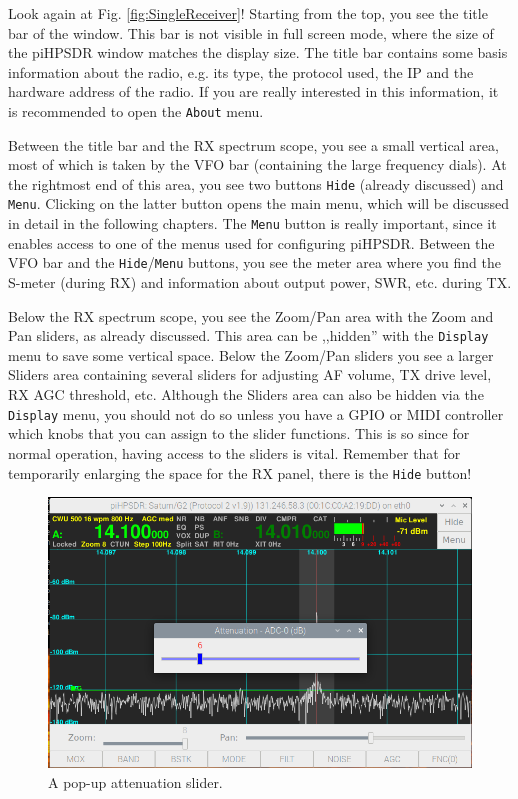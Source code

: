 \documentclass[12pt]{book}
\def\rett#1{\texttt{\color{red}#1}}
\def\bltt#1{\texttt{\color{blue}#1}}
\def\pH{pi\-HPSDR\xspace}
\begin{document}
Look again at Fig. \ref{fig:SingleReceiver}! Starting from the
top, you see the title bar of the window. This bar is not visible
in full screen mode, where the size of the \pH window matches
the display size. The title bar contains some basis information
about the radio, e.g.  its type, the protocol used, the  IP
and the hardware address of the radio. If you are really interested
in this information, it is recommended to open the
\bltt{About} menu.

Between the title bar and the RX spectrum scope, you see
a small vertical area, most of  which is taken by the VFO bar
(containing the large frequency dials). At the rightmost
end of this area, you see two buttons \rett{Hide} (already
discussed) and \rett{Menu}. Clicking on the latter button opens
the main menu, which will be discussed in detail in the following
chapters. The \rett{Menu} button is really important, since it
enables access to one of the menus used for configuring \pH.
Between the VFO bar and the \rett{Hide}/\rett{Menu} buttons,
you see the meter area where you find the S-meter (during RX)
and information about output power, SWR, etc. during TX.

Below the RX  spectrum scope, you see the Zoom/Pan area with
the  Zoom and Pan sliders, as already discussed. This area
can be ,,hidden'' with the \bltt{Display} menu to save some
vertical space. Below the
Zoom/Pan sliders you see a larger  Sliders area containing
several sliders for adjusting AF volume, TX  drive level,
RX  AGC threshold, etc. Although the Sliders area can also
be hidden via the \bltt{Display} menu, you should not do so
unless you have a GPIO or MIDI controller which knobs that
you can assign to the slider functions. This is so since
for  normal operation, having access to the sliders is vital.
Remember that for temporarily enlarging the space for
the RX  panel, there is the \rett{Hide} button!

\begin{figure}
\center
\includegraphics[width=12cm]{SliderOnScreen.png}
\caption{A pop-up attenuation slider.}
\label{fig:SliderOnScreen}
\end{figure}
\end{document}

